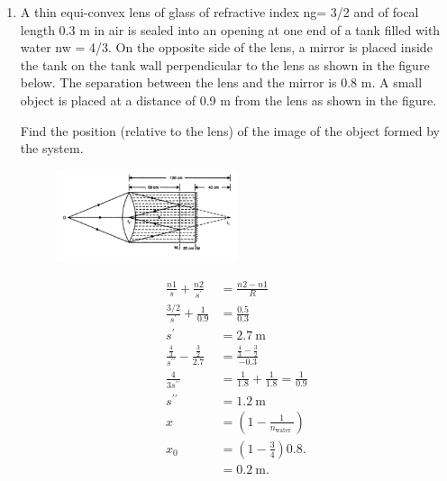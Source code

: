 \documentclass{zc-ust-hw}
\begin{document}
\begin{enumerate}
    \newpage
    
  \item A thin equi-convex lens of glass of refractive index ng= 3/2 and of
    focal length 0.3 m in air is sealed into an opening at one end of a tank
    filled with water nw = 4/3. On the opposite side of the lens, a mirror is
    placed inside the tank on the tank wall perpendicular to the lens as shown
    in the figure below. The separation between the lens and the mirror is 0.8
    m. A small object is placed at a distance of 0.9 m from the lens as shown
    in the figure.  

    Find the position (relative to the lens) of the image of the object formed
    by the system.  
    \begin{figure}[htpb]
      \begin{center}
        \includegraphics[width=0.5\textwidth]{figures/1705970589.png}
      \end{center}
      \caption{}
    \end{figure}

    \begin{sol}
      \begin{align}
        \frac{n 1}{s}+\frac{n 2}{s^{\prime}}&=\frac{n 2-n 1}{R} \\
        \frac{3 / 2}{s^{\prime}}+\frac{1}{0.9}&=\frac{0.5}{0.3} \\
        s^{\prime}&=2.7 \mathrm{~m} \\
        \frac{\frac{4}{3}}{s^{\prime \prime}}-\frac{\frac{3}{2}}{2.7}&=\frac{\frac{4}{3}-\frac{3}{2}}{-0.3}\\
        \frac{4}{3 s^{\prime \prime}}&=\frac{1}{1.8}+\frac{1}{1.8}=\frac{1}{0.9} \\
        s^{\prime \prime}&=1.2 \mathrm{~m} \\
        x&=\left(1-\frac{1}{n_{\text {water }}}\right) \\
        x_0&=\left(1-\frac{3}{4}\right) 0.8 . \\
           &=0.2 \mathrm{~m}
      .\end{align}
    \end{sol}
    
\end{enumerate}
\end{document}

